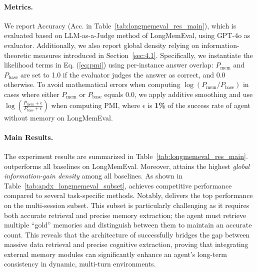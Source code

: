 \paragraph{Metrics.}


We report Accuracy (Acc. in Table~\ref{tab:longmemeval_res_main}), which is evaluated based on LLM-as-a-Judge method of LongMemEval\cite{wu2024longmemeval}, using GPT-4o as evaluator. Additionally, we also report global density relying on information-theoretic
measures introduced in Section~\ref{sec:4.1}. Specifically, we instantiate the likelihood terms in Eq. (\ref{eq:pmi}) using per-instance answer overlap: \(P_{\text{mem}}\) and \(P_{\text{base}}\) are set to 1.0 if the evaluator judges the answer as correct, and 0.0 otherwise. To avoid mathematical errors when computing \(\log(P_{\text{mem}} / P_{\text{base}})\) in cases where either \(P_{\text{mem}}\) or \(P_{\text{base}}\) equals 0.0, we apply additive smoothing and use
$\log\!\left(\frac{P_{\text{mem}}+\epsilon}{P_{\text{base}}+\epsilon}\right)$
when computing PMI, where $\epsilon$ is \textbf{1\%} of the success rate of agent without memory on LongMemEval.

\paragraph{Main Results.} 

The experiment results are summarized in Table~\ref{tab:longmemeval_res_main}. \plugmem outperforms all baselines on LongMemEval. Moreover, \plugmem attains the highest \emph{global information-gain density} among all baselines. As shown in Table~\ref{tab:apdx_longmemeval_subset}, \plugmem achieves competitive performance compared to several task-specific methods. Notably, \plugmem delivers the top performance on the multi-session subset. This subset is particularly challenging as it requires both accurate retrieval and precise memory extraction; the agent must retrieve multiple ``gold'' memories and distinguish between them to maintain an accurate count. This reveals that the architecture of \plugmem successfully bridges the gap between massive data retrieval and precise cognitive extraction, proving that integrating external memory modules can significantly enhance an agent's long-term consistency in dynamic, multi-turn environments.

